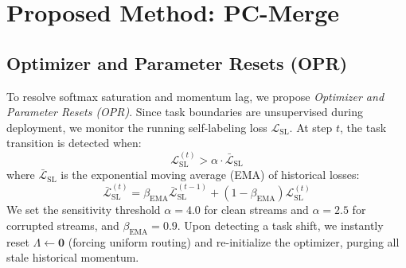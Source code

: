 \documentclass{article}
\theoremstyle{plain}
\theoremstyle{definition}
\theoremstyle{remark}
\begin{document}
\section{Proposed Method: PC-Merge}
\label{sec:method}

\subsection{Optimizer and Parameter Resets (OPR)}
To resolve softmax saturation and momentum lag, we propose \emph{Optimizer and Parameter Resets (OPR)}. Since task boundaries are unsupervised during deployment, we monitor the running self-labeling loss $\mathcal{L}_{\text{SL}}$. At step $t$, the task transition is detected when:
\begin{equation}
\mathcal{L}_{\text{SL}}^{(t)} > \alpha \cdot \bar{\mathcal{L}}_{\text{SL}}
\end{equation}
where $\bar{\mathcal{L}}_{\text{SL}}$ is the exponential moving average (EMA) of historical losses:
\begin{equation}
\bar{\mathcal{L}}_{\text{SL}}^{(t)} = \beta_{\text{EMA}} \bar{\mathcal{L}}_{\text{SL}}^{(t-1)} + (1 - \beta_{\text{EMA}}) \mathcal{L}_{\text{SL}}^{(t)}
\end{equation}
We set the sensitivity threshold $\alpha = 4.0$ for clean streams and $\alpha = 2.5$ for corrupted streams, and $\beta_{\text{EMA}} = 0.9$. Upon detecting a task shift, we instantly reset $\Lambda \leftarrow \mathbf{0}$ (forcing uniform routing) and re-initialize the optimizer, purging all stale historical momentum.
\end{document}
